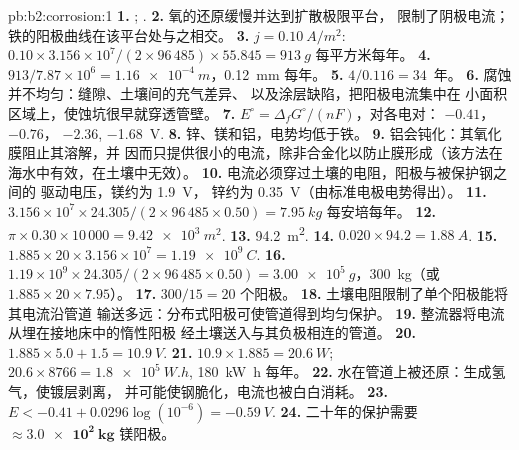 \begin{solution}{pb:b2:corrosion:1}
\textbf{1.} ; .
\textbf{2.} 氧的还原缓慢并达到扩散极限平台，
限制了阴极电流；铁的阳极曲线在该平台处与之相交。
\textbf{3.} $j = \qty{0.10}{A/m^2}$: $0.10 \times 3.156 \times 10^7/(2 \times 96\,485)
\times 55.845 = \qty{913}{g}$ 每平方米每年。
\textbf{4.} $913/7.87 \times 10^6 = \qty{1.16e-4}{m}$，\qty{0.12}{mm} 每年。
\textbf{5.} $4/0.116 = 34$~年。
\textbf{6.} 腐蚀并不均匀：缝隙、土壤间的充气差异、
以及涂层缺陷，把阳极电流集中在
小面积区域上，使蚀坑很早就穿透管壁。
\textbf{7.} $E^\circ = \Delta_f G^\circ/(nF)$，对各电对： $-0.41$， $-0.76$，
 $-2.36$,  \qty{-1.68}{V}.
\textbf{8.} 锌、镁和铝，电势均低于铁。
\textbf{9.} 铝会钝化：其氧化膜阻止其溶解，并
因而只提供很小的电流，除非合金化以防止膜形成（该方法在
海水中有效，在土壤中无效）。
\textbf{10.} 电流必须穿过土壤的电阻，阳极与被保护钢之间的
驱动电压，镁约为 \qty{1.9}{V}，
锌约为 \qty{0.35}{V}（由标准电极电势得出）。
\textbf{11.} $3.156 \times 10^7 \times 24.305/(2 \times 96\,485 \times 0.50) =
\qty{7.95}{kg}$ 每安培每年。
\textbf{12.} $\pi \times 0.30 \times 10\,000 = \qty{9.42e3}{m^2}$.
\textbf{13.} \qty{94.2}{m^2}.
\textbf{14.} $0.020 \times 94.2 = \qty{1.88}{A}$.
\textbf{15.} $1.885 \times 20 \times 3.156 \times 10^7 = \qty{1.19e9}{C}$.
\textbf{16.} $1.19 \times 10^9 \times 24.305/(2 \times 96\,485 \times 0.50) =
\qty{3.00e5}{g}$，\qty{300}{kg}（或 $1.885 \times 20 \times 7.95$）。
\textbf{17.} $300/15 = 20$ 个阳极。
\textbf{18.} 土壤电阻限制了单个阳极能将其电流沿管道
输送多远：分布式阳极可使管道得到均匀保护。
\textbf{19.} 整流器将电流从埋在接地床中的惰性阳极
经土壤送入与其负极相连的管道。
\textbf{20.} $1.885 \times 5.0 + 1.5 = \qty{10.9}{V}$.
\textbf{21.} $10.9 \times 1.885 = \qty{20.6}{W}$; $20.6 \times 8766 = \qty{1.8e5}{W.h}$,
\qty{180}{kW.h} 每年。
\textbf{22.} 水在管道上被还原：生成氢气，使镀层剥离，
并可能使钢脆化，电流也被白白消耗。
\textbf{23.} $E < -0.41 + 0.0296\log(10^{-6}) = \qty{-0.59}{V}$.
\textbf{24.} 二十年的保护需要 $\boldsymbol{\approx \qty{3.0e2}{kg}}$
镁阳极。
\end{solution}
